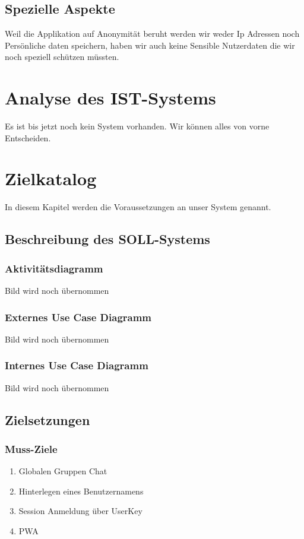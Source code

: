 \documentclass[12pt]{article}
\begin{document}
    \subsection{Spezielle Aspekte}
      Weil die Applikation auf Anonymität beruht werden wir weder Ip Adressen noch Persönliche daten speichern,
      haben wir auch keine Sensible Nutzerdaten die wir noch speziell schützen müssten.

  \section{Analyse des IST-Systems}
    Es ist bis jetzt noch kein System vorhanden. Wir können alles von vorne Entscheiden.

  \section{Zielkatalog}
    In diesem Kapitel werden die Voraussetzungen an unser System genannt.

    \subsection{Beschreibung des SOLL-Systems}
      \subsubsection{Aktivitätsdiagramm}
        Bild wird noch übernommen
      \subsubsection{Externes Use Case Diagramm}
        Bild wird noch übernommen
      \subsubsection{Internes Use Case Diagramm}
        Bild wird noch übernommen

    \subsection{Zielsetzungen}
      \subsubsection{Muss-Ziele}
        \begin{enumerate}
          \item Globalen Gruppen Chat
          \item Hinterlegen eines Benutzernamens
          \item Session Anmeldung über UserKey
          \item PWA
        \end{enumerate}
\end{document}
